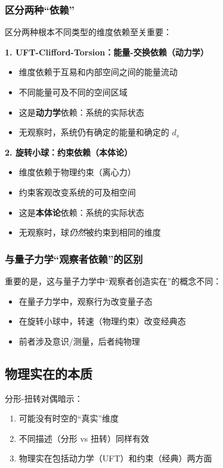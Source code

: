 \documentclass[12pt,a4paper]{article}
\begin{document}
\subsubsection{区分两种``依赖''}

区分两种根本不同类型的维度依赖至关重要：

\textbf{1. UFT-Clifford-Torsion：能量-交换依赖（动力学）}
\begin{itemize}
    \item 维度依赖于互易和内部空间之间的能量流动
    \item 不同能量可及不同的空间区域
    \item 这是\textbf{动力学}依赖：系统的实际状态
    \item 无观察时，系统仍有确定的能量和确定的 $d_s$
\end{itemize}

\textbf{2. 旋转小球：约束依赖（本体论）}
\begin{itemize}
    \item 维度依赖于物理约束（离心力）
    \item 约束客观改变系统的可及相空间
    \item 这是\textbf{本体论}依赖：系统的实际状态
    \item 无观察时，球\textit{仍然}被约束到相同的维度
\end{itemize}

\subsubsection{与量子力学``观察者依赖''的区别}

重要的是，这与量子力学中``观察者创造实在''的概念不同：
\begin{itemize}
    \item 在量子力学中，观察行为改变量子态
    \item 在旋转小球中，转速（物理约束）改变经典态
    \item 前者涉及意识/测量，后者纯物理
\end{itemize}

\subsection{物理实在的本质}

分形-扭转对偶暗示：
\begin{enumerate}
    \item 可能没有时空的``真实''维度
    \item 不同描述（分形 vs 扭转）同样有效
    \item 物理实在包括动力学（UFT）和约束（经典）两方面
\end{enumerate}
\end{document}
